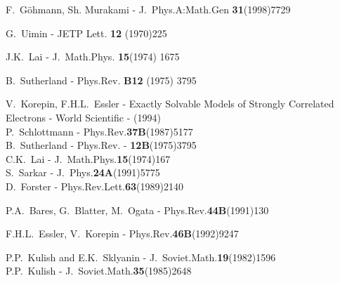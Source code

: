\documentclass[a4paper,12pt]{article}
\begin{document}
\begin{thebibliography}{10}
  F.~G\"ohmann, Sh. Murakami - J.~Phys.A:Math.Gen {\bf 31}(1998)7729


 G.~Uimin -  JETP Lett. {\bf 12} (1970)225

 J.K.~Lai -  J.~Math.Phys. {\bf 15}(1974) 1675

 B.~Sutherland -  Phys.Rev. {\bf B12} (1975) 3795






V.~Korepin, F.H.L.~Essler - Exactly Solvable Models of Strongly 
             Correlated Electrons - World Scientific - (1994)\\
             P.~Schlottmann - Phys.Rev.{\bf 37B}(1987)5177\\
             B.~Sutherland - Phys.Rev. - {\bf 12B}(1975)3795\\
             C.K.~Lai - J.~Math.Phys.{\bf 15}(1974)167\\ 
             S.~Sarkar - J.~Phys.{\bf 24A}(1991)5775\\
             D.~Forster - Phys.Rev.Lett.{\bf 63}(1989)2140 

 P.A.~Bares, G.~Blatter, M.~Ogata - Phys.Rev.{\bf 44B}(1991)130
             
F.H.L.~Essler, V.~Korepin - Phys.Rev.{\bf 46B}(1992)9247  

  P.P.~Kulish and E.K.~Sklyanin - J.~Soviet.Math.{\bf 19}(1982)1596\\ 
              P.P.~Kulish - J.~Soviet.Math.{\bf 35}(1985)2648




\end{thebibliography}
\end{document}
